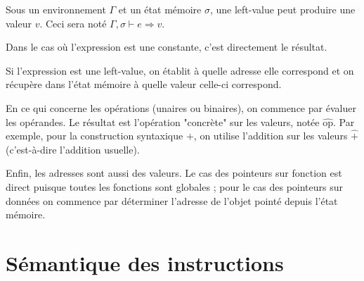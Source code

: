 \begin{definition}
  Sous un environnement $Γ$ et un état mémoire $σ$, une left-value peut
  produire une valeur $v$. Ceci sera noté $Γ, σ ⊢ e ⇒ v$.
\end{definition}

Dans le cas où l'expression est une constante, c'est directement le résultat.

\begin{mathpar}
\end{mathpar}

Si l'expression est une left-value, on établit à quelle adresse elle correspond
et on récupère dans l'état mémoire à quelle valeur celle-ci correspond.

\begin{mathpar}
\end{mathpar}

En ce qui concerne les opérations (unaires ou binaires), on commence par évaluer
les opérandes. Le résultat est l'opération "concrète" sur les valeurs, notée
$\widehat{\textrm{op}}$. Par exemple, pour la construction syntaxique $+$, on
utilise l'addition sur les valeurs $\widehat{+}$ (c'est-à-dire l'addition
usuelle).


Enfin, les adresses sont aussi des valeurs. Le cas des pointeurs sur fonction
est direct puisque toutes les fonctions sont globales ; pour le cas des
pointeurs sur données on commence par déterminer l'adresse de l'objet pointé
depuis l'état mémoire.


\section{Sémantique des instructions}

